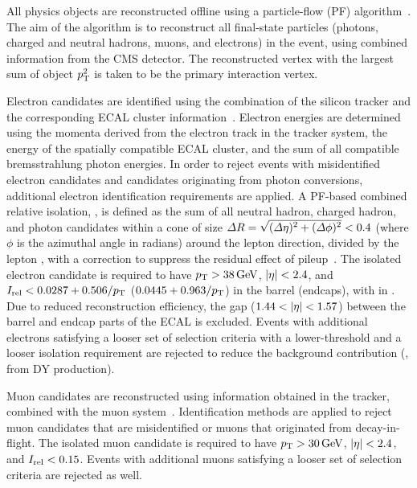 All physics objects are reconstructed offline using a particle-flow (PF) algorithm~\cite{CMS:particle_flow}.
The aim of the algorithm is to reconstruct all final-state particles (photons, charged and neutral hadrons, muons, and electrons) in the event, using combined information from the CMS detector.
The reconstructed vertex with the largest sum of object $p_{\mathrm{T}}^2$ is taken to be the primary \pp interaction vertex.

Electron candidates are identified using the combination of the silicon tracker and the corresponding ECAL cluster information~\cite{CMS:el_PF}.
Electron energies are determined using the momenta derived from the electron track in the tracker system, the energy of the spatially compatible ECAL cluster, and the sum of all compatible bremsstrahlung photon energies.
In order to reject events with misidentified electron candidates and candidates originating from photon conversions, additional electron identification requirements are applied.
A PF-based combined relative isolation, \Irel, is defined as the \PT sum of all neutral hadron, charged hadron, and photon candidates within a cone of size $\Delta R = \sqrt{\smash[b]{(\Delta\eta)^2+(\Delta\phi)^2}} < 0.4$ (where $\phi$ is the azimuthal angle in radians) around the lepton direction, divided by the lepton \PT, with a correction to suppress the residual effect of pileup~\cite{CMS:el_reliso}.
The isolated electron candidate is required to have $p_{\mathrm{T}}>38\,\text{Ge\hspace{-.08em}V}$, $\lvert \eta \rvert < 2.4$, and $I_{\text{rel}} < 0.0287+0.506/p_{\mathrm{T}}$ ($0.0445+0.963/p_{\mathrm{T}}$) in the barrel (endcaps), with \PT in \GeV.
Due to reduced reconstruction efficiency, the gap ($1.44 < \lvert \eta \rvert < 1.57$) between the barrel and endcap parts of the ECAL is excluded.
Events with additional electrons satisfying a looser set of selection criteria with a lower-\PT threshold and a looser isolation requirement are rejected to reduce the background contribution (\eg, from DY production).

Muon candidates are reconstructed using information obtained in the tracker, combined with the muon system~\cite{CMS:mu_PF}.
Identification methods are applied to reject muon candidates that are misidentified or muons that originated from decay-in-flight.
The isolated muon candidate is required to have $p_{\mathrm{T}} > 30\,\text{Ge\hspace{-.08em}V}$, $\lvert \eta \rvert < 2.4$, and $I_{\text{rel}} < 0.15$.
Events with additional muons satisfying a looser set of selection criteria are rejected as well.

